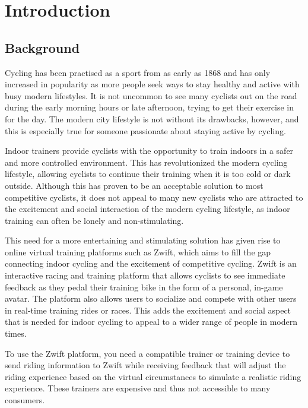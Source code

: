 
\chapter{Introduction}

\section{Background}
Cycling has been practised as a sport from as early as 1868 \citep{Britannica:2022} and has only increased in popularity as more people seek ways to stay healthy and active with busy modern lifestyles. It is not uncommon to see many cyclists out on the road during the early morning hours or late afternoon, trying to get their exercise in for the day. The modern city lifestyle is not without its drawbacks, however, and this is especially true for someone passionate about staying active by cycling.

Indoor trainers provide cyclists with the opportunity to train indoors in a safer and more controlled environment. This has revolutionized the modern cycling lifestyle, allowing cyclists to continue their training when it is too cold or dark outside. Although this has proven to be an acceptable solution to most competitive cyclists, it does not appeal to many new cyclists who are attracted to the excitement and social interaction of the modern cycling lifestyle, as indoor training can often be lonely and non-stimulating.

\newpage

This need for a more entertaining and stimulating solution has given rise to online virtual training platforms such as Zwift, which aims to fill the gap connecting indoor cycling and the excitement of competitive cycling. Zwift is an interactive racing and training platform that allows cyclists to see immediate feedback as they pedal their training bike in the form of a personal, in-game avatar. The platform also allows users to socialize and compete with other users in real-time training rides or races. This adds the excitement and social aspect that is needed for indoor cycling to appeal to a wider range of people in modern times.

To use the Zwift platform, you need a compatible trainer or training device to send riding information to Zwift while receiving feedback that will adjust the riding experience based on the virtual circumstances to simulate a realistic riding experience. These trainers are expensive and thus not accessible to many consumers.

